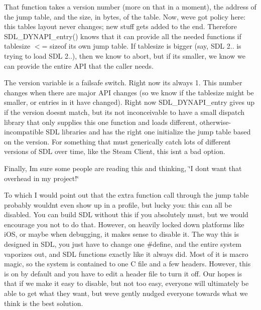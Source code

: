 That function takes a version number (more on that in a moment), the address of the jump table, and the size, in bytes, of the table. Now, we\textquotesingle{}ve got policy here\+: this table\textquotesingle{}s layout never changes; new stuff gets added to the end. Therefore SDL\+\_\+\+DYNAPI\+\_\+entry() knows that it can provide all the needed functions if tablesize \texorpdfstring{$<$}{<}= sizeof its own jump table. If tablesize is bigger (say, SDL 2.. is trying to load SDL 2..), then we know to abort, but if it\textquotesingle{}s smaller, we know we can provide the entire API that the caller needs.

The version variable is a failsafe switch. Right now it\textquotesingle{}s always 1. This number changes when there are major API changes (so we know if the tablesize might be smaller, or entries in it have changed). Right now SDL\+\_\+\+DYNAPI\+\_\+entry gives up if the version doesn\textquotesingle{}t match, but it\textquotesingle{}s not inconceivable to have a small dispatch library that only supplies this one function and loads different, otherwise-\/incompatible SDL libraries and has the right one initialize the jump table based on the version. For something that must generically catch lots of different versions of SDL over time, like the Steam Client, this isn\textquotesingle{}t a bad option.

Finally, I\textquotesingle{}m sure some people are reading this and thinking, \char`\"{}\+I don\textquotesingle{}t want that overhead in my project!\char`\"{} ~\newline


To which I would point out that the extra function call through the jump table probably wouldn\textquotesingle{}t even show up in a profile, but lucky you\+: this can all be disabled. You can build SDL without this if you absolutely must, but we would encourage you not to do that. However, on heavily locked down platforms like i\+OS, or maybe when debugging, it makes sense to disable it. The way this is designed in SDL, you just have to change one \#define, and the entire system vaporizes out, and SDL functions exactly like it always did. Most of it is macro magic, so the system is contained to one C file and a few headers. However, this is on by default and you have to edit a header file to turn it off. Our hopes is that if we make it easy to disable, but not too easy, everyone will ultimately be able to get what they want, but we\textquotesingle{}ve gently nudged everyone towards what we think is the best solution. 